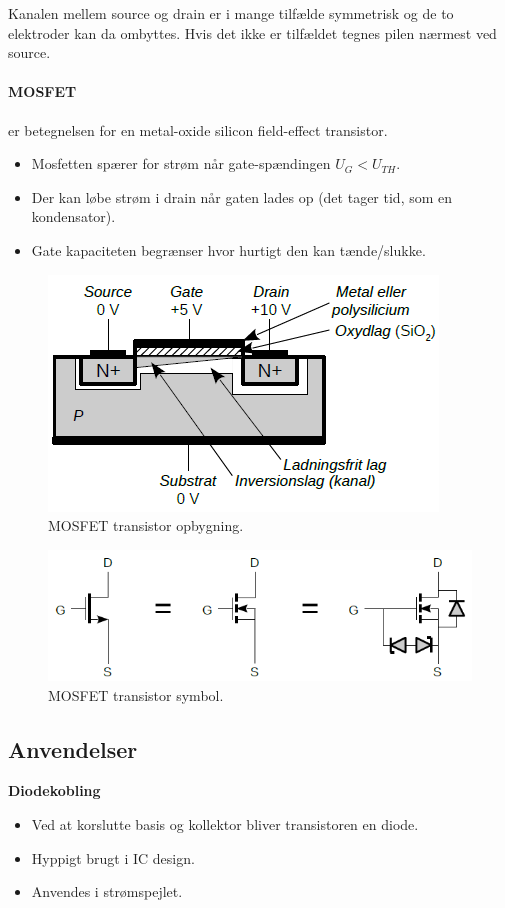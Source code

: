 \documentclass[danish]{article}
\begin{document}
Kanalen mellem source og drain er i mange tilfælde symmetrisk og de to elektroder kan da ombyttes. Hvis det ikke er tilfældet tegnes pilen nærmest ved source.


\paragraph{MOSFET} er betegnelsen for en metal-oxide silicon field-effect transistor.

\begin{itemize}
	\item Mosfetten spærer for strøm når gate-spændingen $U_G < U_{TH}$.
	\item Der kan løbe strøm i drain når gaten lades op (det tager tid, som en kondensator).
	\item Gate kapaciteten begrænser hvor hurtigt den kan tænde/slukke.
\end{itemize}

\begin{figure} [H]
	\centering
	\includegraphics[width=0.7\linewidth]{graphics/mosfet}
	\caption{MOSFET transistor opbygning.}
	\label{fig:mosfet}
\end{figure}

\begin{figure} [H]
	\centering
	\includegraphics[width=\linewidth]{graphics/mosfet_symbol}
	\caption{MOSFET transistor symbol.}
	\label{fig:mosfet_symbol}
\end{figure}

\subsection{Anvendelser}
\textbf{Diodekobling}
\begin{itemize}
	\item Ved at korslutte basis og kollektor bliver transistoren en diode.
	\item Hyppigt brugt i IC design.
	\item Anvendes i strømspejlet.
\end{itemize}
\end{document}
